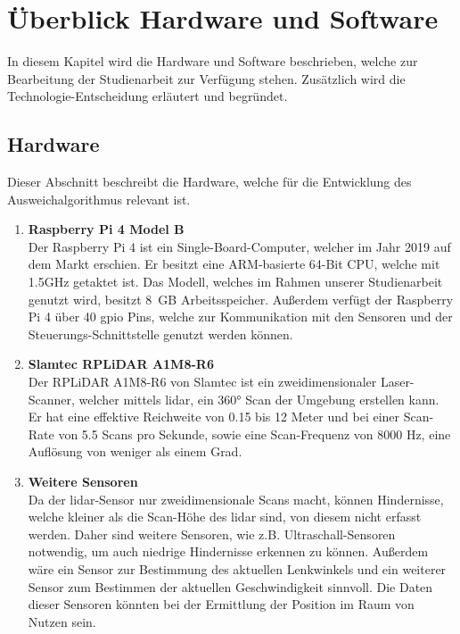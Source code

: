 \section{Überblick Hardware und Software}
In diesem Kapitel wird die Hardware und Software beschrieben, welche zur Bearbeitung der Studienarbeit zur Verfügung stehen.
Zusätzlich wird die Technologie-Entscheidung erläutert und begründet.

\subsection{Hardware}
\label{hardware_uebersicht}
Dieser Abschnitt beschreibt die Hardware, welche für die Entwicklung des Ausweichalgorithmus relevant ist. 

\begin{enumerate}[leftmargin=*]
    \item \textbf{Raspberry Pi 4 Model B} \\
    Der Raspberry Pi 4 ist ein Single-Board-Computer, welcher im Jahr 2019 auf dem Markt erschien. 
    Er besitzt eine ARM-basierte 64-Bit CPU, welche mit 1.5GHz getaktet ist. Das Modell, welches im Rahmen unserer Studienarbeit genutzt wird, besitzt 8 GB Arbeitsspeicher. 
    Außerdem verfügt der Raspberry Pi 4 über 40 \acf{gpio} Pins, welche zur Kommunikation mit den Sensoren und der Steuerungs-Schnittstelle genutzt werden können. \cite{RasPi2024}

    \item \textbf{Slamtec RPLiDAR A1M8-R6} \\
    Der RPLiDAR A1M8-R6 von Slamtec ist ein zweidimensionaler Laser-Scanner, welcher mittels \acf{lidar}, ein 360° Scan der Umgebung erstellen kann. \cite[p. 3]{Slamtec2020}
    Er hat eine effektive Reichweite von 0.15 bis 12 Meter und bei einer Scan-Rate von 5.5 Scans pro Sekunde, sowie eine Scan-Frequenz von 8000 Hz, eine Auflösung von weniger als einem Grad. \cite[p. 8]{Slamtec2020}
    
    \item \textbf{Weitere Sensoren} \\
    Da der \ac{lidar}-Sensor nur zweidimensionale Scans macht, können Hindernisse, welche kleiner als die Scan-Höhe des \ac{lidar} sind, von diesem nicht erfasst werden. 
    Daher sind weitere Sensoren, wie z.B. Ultraschall-Sensoren notwendig, um auch niedrige Hindernisse erkennen zu können. 
    Außerdem wäre ein Sensor zur Bestimmung des aktuellen Lenkwinkels und ein weiterer Sensor zum Bestimmen der aktuellen Geschwindigkeit sinnvoll. 
    Die Daten dieser Sensoren könnten bei der Ermittlung der Position im Raum von Nutzen sein. 
\end{enumerate}

